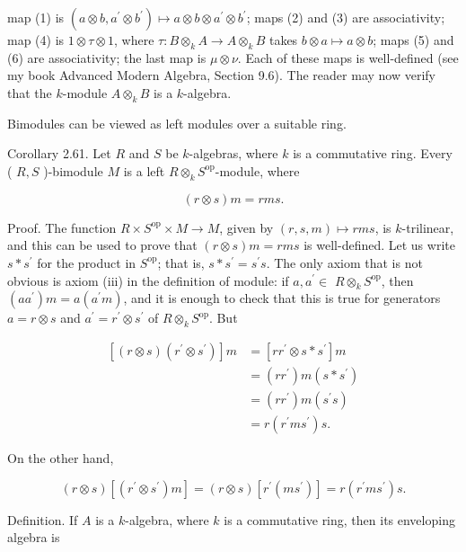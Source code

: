\documentclass[10pt, letterpaper]{article}
\begin{document}
map (1) is $\left(a \otimes b, a^{\prime} \otimes b^{\prime}\right) \mapsto a \otimes b \otimes a^{\prime} \otimes b^{\prime}$; maps (2) and (3) are associativity; map (4) is $1 \otimes \tau \otimes 1$, where $\tau: B \otimes_{k} A \rightarrow A \otimes_{k} B$ takes $b \otimes a \mapsto a \otimes b$; maps (5) and (6) are associativity; the last map is $\mu \otimes \nu$. Each of these maps is well-defined (see my book Advanced Modern Algebra, Section 9.6). The reader may now verify that the $k$-module $A \otimes_{k} B$ is a $k$-algebra.

Bimodules can be viewed as left modules over a suitable ring.

Corollary 2.61. Let $R$ and $S$ be $k$-algebras, where $k$ is a commutative ring. Every ( $R, S$ )-bimodule $M$ is a left $R \otimes_{k} S^{\mathrm{op}}$-module, where

$$
(r \otimes s) m=r m s .
$$

Proof. The function $R \times S^{\mathrm{op}} \times M \rightarrow M$, given by $(r, s, m) \mapsto r m s$, is $k$-trilinear, and this can be used to prove that $(r \otimes s) m=r m s$ is well-defined. Let us write $s * s^{\prime}$ for the product in $S^{\mathrm{op}}$; that is, $s * s^{\prime}=s^{\prime} s$. The only axiom that is not obvious is axiom (iii) in the definition of module: if $a, a^{\prime} \in$ $R \otimes_{k} S^{\mathrm{op}}$, then $\left(a a^{\prime}\right) m=a\left(a^{\prime} m\right)$, and it is enough to check that this is true for generators $a=r \otimes s$ and $a^{\prime}=r^{\prime} \otimes s^{\prime}$ of $R \otimes_{k} S^{\mathrm{op}}$. But

$$
\begin{aligned}
{\left[(r \otimes s)\left(r^{\prime} \otimes s^{\prime}\right)\right] m } & =\left[r r^{\prime} \otimes s * s^{\prime}\right] m \\
& =\left(r r^{\prime}\right) m\left(s * s^{\prime}\right) \\
& =\left(r r^{\prime}\right) m\left(s^{\prime} s\right) \\
& =r\left(r^{\prime} m s^{\prime}\right) s .
\end{aligned}
$$

On the other hand,

$$
(r \otimes s)\left[\left(r^{\prime} \otimes s^{\prime}\right) m\right]=(r \otimes s)\left[r^{\prime}\left(m s^{\prime}\right)\right]=r\left(r^{\prime} m s^{\prime}\right) s .
$$

Definition. If $A$ is a $k$-algebra, where $k$ is a commutative ring, then its enveloping algebra is
\end{document}
